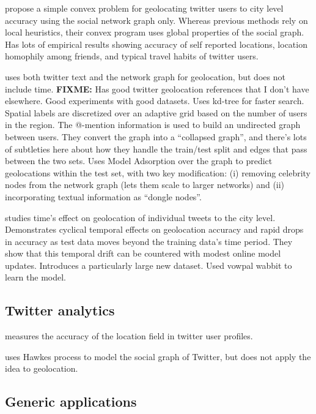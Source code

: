 \documentclass{article}
\newcommand{\fixme}[1]{\textbf{FIXME:} {#1}}
\begin{document}
\citet{compton2014geotagging} propose a simple convex problem for geolocating twitter users to city level accuracy using the social network graph only.
Whereas previous methods rely on local heuristics, their convex program uses global properties of the social graph.
Has lots of empirical results showing accuracy of self reported locations, location homophily among friends, and typical travel habits of twitter users.

\citet{rahimi2015twitter} uses both twitter text and the network graph for geolocation, but does not include time.
\fixme{Has good twitter geolocation references that I don't have elsewhere.}
Good experiments with good datasets.
Uses kd-tree for faster search.
Spatial labels are discretized over an adaptive grid based on the number of users in the region.
The @-mention information is used to build an undirected graph between users.
They convert the graph into a ``collapsed graph'', and there's lots of subtleties here about how they handle the train/test split and edges that pass between the two sets.
Uses Model Adsorption over the graph to predict geolocations within the test set, 
with two key modification:
(i) removing celebrity nodes from the network graph (lets them scale to larger networks)
and (ii) incorporating textual information as ``dongle nodes''.

\citet{dredze2016geolocation} studies time's effect on geolocation of individual tweets to the city level.
Demonstrates cyclical temporal effects on geolocation accuracy and rapid drops in accuracy as test data moves beyond the training data's time period.
They show that this temporal drift can be countered with modest online model updates.
Introduces a particularly large new dataset.
Used vowpal wabbit to learn the model.


\subsection{Twitter analytics}

\citet{hecht2011tweets} measures the accuracy of the location field in twitter user profiles.

\citet{he2015hawkestopic} uses Hawkes process to model the social graph of Twitter,
but does not apply the idea to geolocation.


\subsection{Generic applications}
\end{document}
